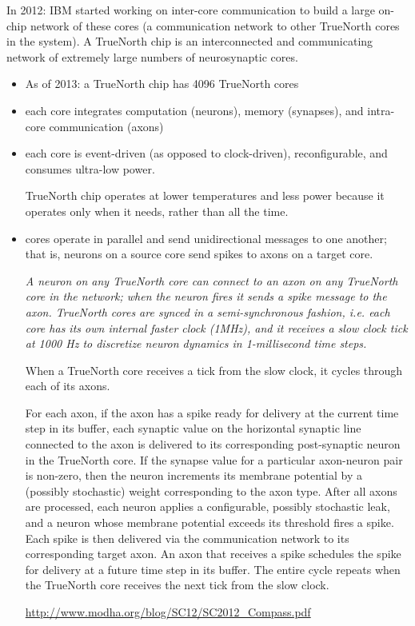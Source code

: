 In 2012: IBM started working on inter-core communication to build a large
on-chip network of these cores (a communication  network  to  other  TrueNorth 
cores  in  the  system).  A TrueNorth chip is an interconnected and
communicating  network  of  extremely large numbers  of neurosynaptic  cores.
\begin{itemize}
  \item As of 2013: a TrueNorth chip has 4096 TrueNorth cores
  
  \item  each  core  integrates computation  (neurons),  memory  (synapses), 
  and  intra-core communication  (axons)
  
  \item each  core  is  event-driven  (as  opposed  to  clock-driven),
  reconfigurable, and consumes ultra-low power.

TrueNorth chip operates at lower temperatures and less power because it operates
only when it needs, rather than all the time.

  \item cores operate  in  parallel  and  send  unidirectional  messages  to 
  one another;  that  is,  neurons  on  a  source  core  send  spikes  to
axons on a target core.

{\it A neuron on any TrueNorth core can connect  to  an  axon  on  any 
TrueNorth core  in  the  network; when the neuron fires it sends a spike message to the
axon.  TrueNorth  cores  are synced in a semi-synchronous fashion, i.e. each
core has its own internal faster clock (1MHz), and it receives  a slow clock
tick at 1000 Hz to discretize neuron dynamics in 1-millisecond time steps.

When a TrueNorth core receives a tick from the slow clock, it cycles through
each of its axons.

For  each  axon,  if  the  axon  has  a  spike  ready  for  delivery  at the
current time step in its buffer, each synaptic value on the horizontal  synaptic
 line  connected  to  the  axon  is  delivered to  its  corresponding 
post-synaptic  neuron  in  the  TrueNorth core. If the synapse value for a
particular axon-neuron pair is non-zero,  then  the neuron  increments its 
membrane potential by  a  (possibly  stochastic)  weight  corresponding  to  the
 axon type.  After  all  axons  are  processed,  each  neuron  applies  a
configurable,  possibly  stochastic  leak,  and  a  neuron  whose membrane 
potential  exceeds  its  threshold  fires  a  spike.  Each spike  is  then 
delivered  via  the  communication  network  to its  corresponding  target 
axon.  An  axon  that  receives  a  spike schedules  the  spike  for  delivery 
at  a  future  time  step  in  its buffer.  The  entire  cycle  repeats  when 
the  TrueNorth  core receives the next tick from the slow clock.}
\url{http://www.modha.org/blog/SC12/SC2012_Compass.pdf}

\end{itemize}  

